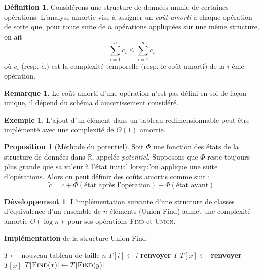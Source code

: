 \documentclass[a5paper, 10pt]{article}
\theoremstyle{definition}
\newtheorem{definition}[equation]{Définition}
\newtheorem{example}[equation]{Exemple}
\newtheorem{proposition}[equation]{Proposition}
\newtheorem{remark}[equation]{Remarque}
\newcounter{n}
\newtheorem{dev}[n]{Développement}
\def\R{\mathbb{R}}
\begin{document}
\begin{definition}
  Considérons une structure de données munie de certaines opérations. L'analyse
  amortie vise à assigner un \emph{coût amorti} à chaque opération de sorte que,
  pour toute suite de $n$ opérations appliquées sur une même structure, on ait
  \[ \sum_{i=1}^n c_i \leq \sum_{i=1}^n \tilde{c}_i  \]
  où $c_i$ (resp. $\tilde{c}_i$) est la complexité temporelle (resp. le coût
  amorti) de la $i$-ème opération.
\end{definition}
\begin{remark}
  Le coût amorti d'une opération n'est pas défini en soi de façon unique, il
  dépend du schéma d'amortissement considéré.
\end{remark}

\begin{example}
  L'ajout d'un élément dans un tableau redimensionnable peut être implémenté
  avec une complexité de $O(1)$ amortie.
\end{example}

\begin{proposition}[Méthode du potentiel]
  Soit $\Phi$ une fonction des états de la structure de données dans $\R$,
  appelée \emph{potentiel}. Supposons que $\Phi$ reste toujours plus grande que
  sa valeur à l'état initial lorsqu'on applique une suite d'opérations. Alors on
  peut définir des coûts amortis comme suit :
  \[ \tilde{c} = c + \Phi(\text{état après l'opération}) - \Phi(\text{état avant})\]
\end{proposition}

\begin{dev}
  L'implémentation suivante d'une structure de classes d'équivalence d'un
  ensemble de $n$ éléments (Union-Find) admet une complexité amortie $O(\log n)$
  pour ses opérations \textsc{Find} et \textsc{Union}.
\end{dev}

\begin{algorithm}
\caption*{\textbf{Implémentation} de la structure Union-Find}
\begin{algorithmic}
\State $T \gets $ nouveau tableau de taille $n$
\State $T[i] \gets i$
\EndFor
\State \textbf{renvoyer} $T$
\EndProcedure
{}
$T[x] \gets $ 
\EndIf
\State \textbf{renvoyer} $T[x]$
\EndProcedure
{}
\State $T[\text{\Call{Find}{$x$}}] \gets T[\text{\Call{Find}{$y$}}]$
\EndProcedure
\end{algorithmic}
\end{algorithm}
\end{document}
